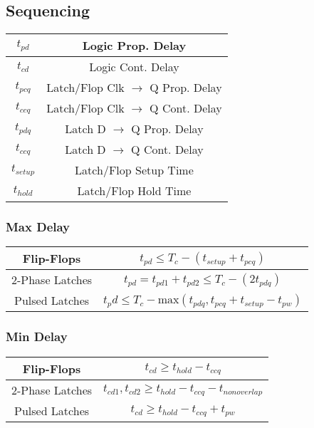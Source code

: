 \subsection{Sequencing}
\begin{tabular}{| c | c |}
    \hline
    $t_{pd}$ & Logic Prop. Delay \\
    \hline
    $t_{cd}$ & Logic Cont. Delay \\
    \hline
    $t_{pcq}$ & Latch/Flop Clk $\xrightarrow{}$ Q Prop. Delay \\
    \hline
    $t_{ccq}$ & Latch/Flop Clk $\xrightarrow{}$ Q Cont. Delay \\
    \hline
    $t_{pdq}$ & Latch D $\xrightarrow{}$ Q Prop. Delay \\
    \hline
    $t_{ccq}$ & Latch D $\xrightarrow{}$ Q Cont. Delay \\
    \hline
    $t_{setup}$ & Latch/Flop Setup Time \\
    \hline
    $t_{hold}$ & Latch/Flop Hold Time \\
    \hline
\end{tabular}
    \subsubsection{Max Delay}
    \begin{tabular}{| c | c |}
        \hline
        Flip-Flops & $t_{pd} \leq T_c - (t_{setup} + t_{pcq})$ \\
        \hline
        2-Phase Latches & $t_{pd} = t_{pd1} + t_{pd2} \leq T_c - (2t_{pdq})$ \\
        \hline
        Pulsed Latches & $t_pd \leq T_c - \text{max}\left( t_{pdq}, t_{pcq} + t_{setup} - t_{pw}\right)$ \\
        \hline
    \end{tabular}

    \subsubsection{Min Delay}
    \begin{tabular}{| c | c |}
        \hline
        Flip-Flops & $t_{cd} \geq t_{hold} - t_{ccq}$ \\
        \hline
        2-Phase Latches & $t_{cd1},t_{cd2} \geq t_{hold} - t_{ccq} - t_{nonoverlap}$ \\
        \hline
        Pulsed Latches & $t_{cd} \geq t_{hold} - t_{ccq} + t_{pw}$ \\
        \hline
    \end{tabular}

